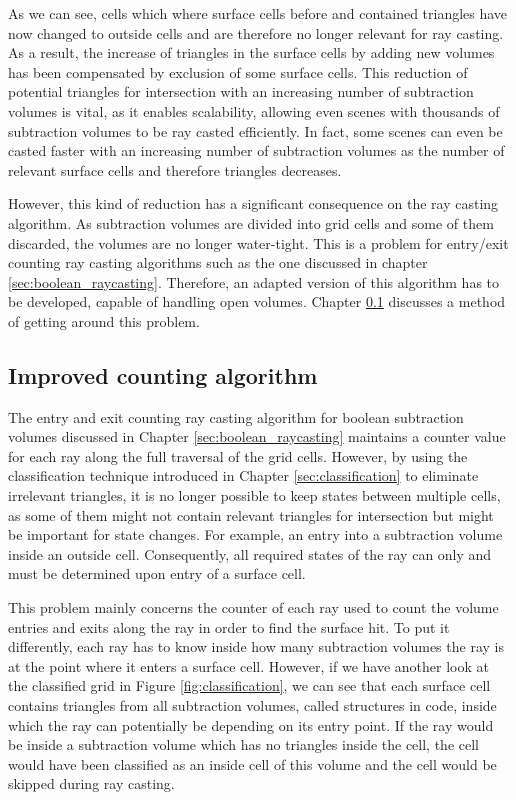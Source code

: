 As we can see, cells which where surface cells before and contained triangles have now changed to outside cells and are therefore no longer relevant for ray casting. As a result, the increase of triangles in the surface cells by adding new volumes has been compensated by exclusion of some surface cells. This reduction of potential triangles for intersection with an increasing number of subtraction volumes is vital, as it enables scalability, allowing even scenes with thousands of subtraction volumes to be ray casted efficiently. In fact, some scenes can even be casted faster with an increasing number of subtraction volumes as the number of relevant surface cells and therefore triangles decreases.

However, this kind of reduction has a significant consequence on the ray casting algorithm. As subtraction volumes are divided into grid cells and some of them discarded, the volumes are no longer water-tight. This is a problem for entry/exit counting ray casting algorithms such as the one discussed in chapter \ref{sec:boolean_raycasting}. Therefore, an adapted version of this algorithm has to be developed, capable of handling open volumes. Chapter \ref{sec:adapted_ray_casting} discusses a method of getting around this problem.


\subsection{Improved counting algorithm}
\label{sec:adapted_ray_casting}

The entry and exit counting ray casting algorithm for boolean subtraction volumes discussed in Chapter \ref{sec:boolean_raycasting} maintains a counter value for each ray along the full traversal of the grid cells. However, by using the classification technique introduced in Chapter \ref{sec:classification} to eliminate irrelevant triangles, it is no longer possible to keep states between multiple cells, as some of them might not contain relevant triangles for intersection but might be important for state changes. For example, an entry into a subtraction volume inside an outside cell. Consequently, all required states of the ray can only and must be determined upon entry of a surface cell.

This problem mainly concerns the counter of each ray used to count the volume entries and exits along the ray in order to find the surface hit. To put it differently, each ray has to know inside how many subtraction volumes the ray is at the point where it enters a surface cell. However, if we have another look at the classified grid in Figure \ref{fig:classification}, we can see that each surface cell contains triangles from all subtraction volumes, called structures in code, inside which the ray can potentially be depending on its entry point. If the ray would be inside a subtraction volume which has no triangles inside the cell, the cell would have been classified as an inside cell of this volume and the cell would be skipped during ray casting.

